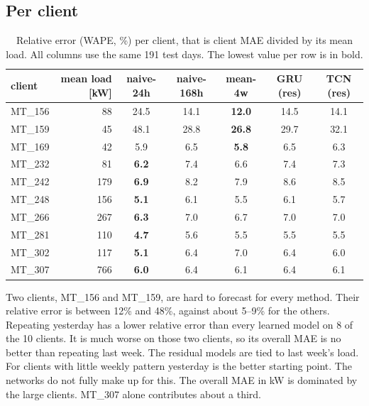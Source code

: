 \documentclass[10pt,a4paper]{article}
\begin{document}
\subsection{Per client}
\begin{table}[!ht]
\centering\footnotesize
\caption{Relative error (WAPE, \%) per client, that is client MAE divided by its mean load. All columns use the same 191 test days. The lowest value per row is in bold.}
\begin{tabular}{@{}lrccccc@{}}
\toprule
client & mean load [kW] & naive-24h & naive-168h & mean-4w & GRU (res) & TCN (res)\\
\midrule
MT\_156 &  88 & 24.5 & 14.1 & \textbf{12.0} & 14.5 & 14.1\\
MT\_159 &  45 & 48.1 & 28.8 & \textbf{26.8} & 29.7 & 32.1\\
MT\_169 &  42 &  5.9 &  6.5 & \textbf{5.8}  &  6.5 &  6.3\\
MT\_232 &  81 & \textbf{6.2} & 7.4 & 6.6 &  7.4 &  7.3\\
MT\_242 & 179 & \textbf{6.9} & 8.2 & 7.9 &  8.6 &  8.5\\
MT\_248 & 156 & \textbf{5.1} & 6.1 & 5.5 &  6.1 &  5.7\\
MT\_266 & 267 & \textbf{6.3} & 7.0 & 6.7 &  7.0 &  7.0\\
MT\_281 & 110 & \textbf{4.7} & 5.6 & 5.5 &  5.5 &  5.5\\
MT\_302 & 117 & \textbf{5.1} & 6.4 & 7.0 &  6.4 &  6.0\\
MT\_307 & 766 & \textbf{6.0} & 6.4 & 6.1 &  6.4 &  6.1\\
\bottomrule
\end{tabular}
\end{table}

Two clients, MT\_156 and MT\_159, are hard to forecast for every method. Their relative error is between 12\% and 48\%, against about 5--9\% for the others. Repeating yesterday has a lower relative error than every learned model on 8 of the 10 clients. It is much worse on those two clients, so its overall MAE is no better than repeating last week. The residual models are tied to last week's load. For clients with little weekly pattern yesterday is the better starting point. The networks do not fully make up for this. The overall MAE in kW is dominated by the large clients. MT\_307 alone contributes about a third.
\end{document}
